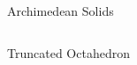 \documentclass{beamer}
\begin{document}
\begin{frame}{Archimedean Solids}
\begin{columns}
\begin{column}{0.32\textwidth}

      Truncated Octahedron
     \end{column}
    \begin{column}{0.32\textwidth}
      \centering
      


\end{column}
\end{columns}
\end{frame}
\end{document}
